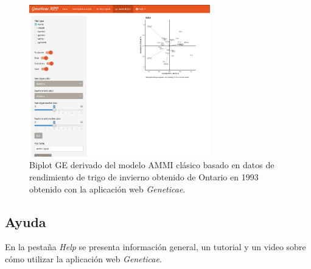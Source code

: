 \begin{figure}[h]
	\begin{center}
		\includegraphics[width=0.70\textwidth]{./Graficos/AMMI_GE.png}
	\end{center}
	\caption{Biplot GE derivado del modelo AMMI clásico basado en datos de rendimiento de trigo de invierno obtenido de Ontario en 1993 obtenido con la aplicación web \emph{Geneticae}.}
	\label{fig:figammiapp}
\end{figure}


\subsection{Ayuda}

En la pestaña \emph{Help} se presenta información general, un tutorial y un video sobre cómo utilizar la aplicación web \emph{Geneticae}.
